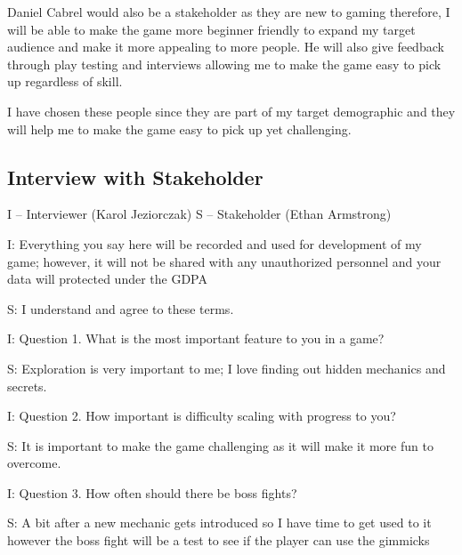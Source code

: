 \documentclass{article}
\newcommand{\parBr}{\vspace{5mm}}%
\begin{document}
\parBr

Daniel Cabrel would also be a stakeholder as they are new to gaming therefore, I will be able to make the game more beginner friendly to expand my target audience and make it more appealing to more people. He will also give feedback through play testing and interviews allowing me to make the game easy to pick up regardless of skill. 

\parBr

I have chosen these people since they are part of my target demographic and they will help me to make the game easy to pick up yet challenging.

\subsection{Interview with Stakeholder}
\begin{flushleft}
I – Interviewer (Karol Jeziorczak) \linebreak
S – Stakeholder (Ethan Armstrong) 
\end{flushleft} 

\parBr

I: Everything you say here will be recorded and used for development of my game; however, it will not be shared with any unauthorized personnel and your data will protected under the GDPA 

\parBr

S: I understand and agree to these terms. 

\parBr

I: Question 1. What is the most important feature to you in a game? 

\parBr

S: Exploration is very important to me; I love finding out hidden mechanics and secrets. 

\parBr

I: Question 2. How important is difficulty scaling with progress to you? 

\parBr

S: It is important to make the game challenging as it will make it more fun to overcome. 

\parBr

I: Question 3. How often should there be boss fights? 

\parBr

S: A bit after a new mechanic gets introduced so I have time to get used to it however the boss fight will be a test to see if the player can use the gimmicks 
\end{document}
